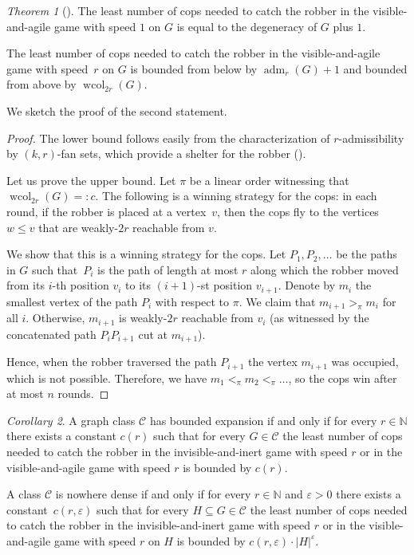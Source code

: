 \documentclass[1p,number,a4paper]{elsarticle}
\theoremstyle{remark}
\newcommand{\Cc}{\mathscr{C}}
\newcommand{\N}{\mathbb{N}}
\DeclareMathOperator{\copw}{copwidth}
\renewcommand{\epsilon}{\varepsilon}
\DeclareMathOperator{\wcol}{wcol}
\DeclareMathOperator{\adm}{adm}
\newtheorem{theorem}{Theorem}[section]
\newtheorem{corollary}[theorem]{Corollary}
\begin{document}

\begin{theorem}[\cite{torunczyk2023flip}]
    The least number of cops needed to catch the robber 
in the visible-and-agile game with speed $1$ on $G$ is equal to the degeneracy of $G$ plus $1$.    

\smallskip
The least number of cops needed to catch the robber 
in the visible-and-agile game with speed~$r$ on $G$ is bounded from below by $\adm_r(G)+1$ and bounded from above by $\wcol_{2r}(G)$. 
\end{theorem}

We sketch the proof of the second statement. 

\begin{proof}
  The lower bound follows easily from the characterization of $r$-admissibility by $(k,r)$-fan sets, which provide a shelter for the robber (). 

  Let us prove the upper bound. Let $\pi$ be a linear order witnessing that $\wcol_{2r}(G) =: c$. The following is a winning strategy for the cops:
  in each round, if the robber is placed at a vertex~$v$, then the cops fly to the vertices $w\leq v$ that are weakly-$2r$ reachable from $v$. 
  
  We show that this is a winning strategy for the cops. 
  Let $P_1,P_2,\ldots$ be the paths in $G$ such that~$P_i$ is the path of length at most $r$ along which the robber moved from its $i$-th position $v_i$ to its $(i+1)$-st position $v_{i+1}$. 
  Denote by $m_i$ the smallest vertex of the path $P_i$ with respect to $\pi$. We claim that $m_{i+1}>_\pi m_i$ for all $i$. 
  Otherwise, $m_{i+1}$ is weakly-$2r$ reachable from $v_i$ (as witnessed by the concatenated path $P_i P_{i+1}$ cut at $m_{i+1}$). 
  
  Hence, when the robber traversed the path $P_{i+1}$ the vertex $m_{i+1}$ was occupied, which is not possible. 
  Therefore, we have $m_1<_\pi m_2<_\pi \ldots$, so the cops win after at most $n$ rounds.
\end{proof}

\begin{corollary}\label{cor:copw}
A graph class $\Cc$ has bounded expansion if and only if for every $r\in\N$ there exists a constant $c(r)$ such that for every $G\in \Cc$ the least number of cops needed to catch the robber in the invisible-and-inert game with speed $r$ or in the visible-and-agile game with speed $r$ is bounded by $c(r)$. 

\medskip
A class $\Cc$ is nowhere dense if and only if 
for every $r\in\N$ and $\epsilon>0$ there exists a constant~$c(r,\epsilon)$ such that 
for every $H\subseteq G\in \Cc$ the least number of cops needed to catch the robber in the invisible-and-inert game with speed $r$ or in the visible-and-agile game with speed $r$ on $H$ is bounded by $c(r,\epsilon)\cdot |H|^\epsilon$. 
\end{corollary}
\end{document}
